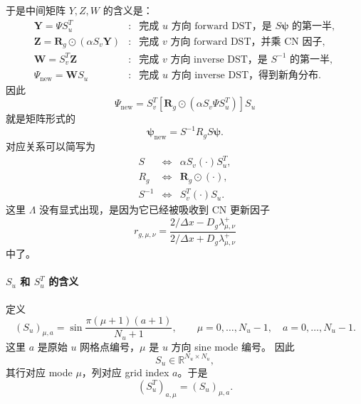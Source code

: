 \documentclass[11pt,a4paper]{ctexart}
\begin{document}
于是中间矩阵 \(Y,Z,W\) 的含义是：
\begin{equation}
\begin{array}{lll}
\mathbf Y=\Psi S_u^T
&:& \text{完成 }u\text{ 方向 forward DST，是 }S\boldsymbol\psi\text{ 的第一半},\\[0.4em]
\mathbf Z=\mathbf R_g\odot(\alpha S_v\mathbf Y)
&:& \text{完成 }v\text{ 方向 forward DST，并乘 CN 因子},\\[0.4em]
\mathbf W=S_v^T\mathbf Z
&:& \text{完成 }v\text{ 方向 inverse DST，是 }S^{-1}\text{ 的第一半},\\[0.4em]
\Psi_{\mathrm{new}}=\mathbf W S_u
&:& \text{完成 }u\text{ 方向 inverse DST，得到新角分布}.
\end{array}
\end{equation}
因此
\begin{equation}
  \boxed{
  \Psi_{\mathrm{new}}
  =
  S_v^T
  \left[
    \mathbf R_g
    \odot
    \left(
      \alpha S_v\Psi S_u^T
    \right)
  \right]
  S_u
  }
\end{equation}
就是矩阵形式的
\begin{equation}
  \boxed{
  \boldsymbol\psi_{\mathrm{new}}
  =
  S^{-1}R_gS\boldsymbol\psi.
  }
\end{equation}
对应关系可以简写为
\begin{equation}
\begin{array}{lll}
S &\Longleftrightarrow& \alpha S_v(\cdot)S_u^T,\\[0.3em]
R_g &\Longleftrightarrow& \mathbf R_g\odot(\cdot),\\[0.3em]
S^{-1} &\Longleftrightarrow& S_v^T(\cdot)S_u.
\end{array}
\end{equation}
这里 \(\Lambda\) 没有显式出现，是因为它已经被吸收到 CN 更新因子
\begin{equation}
  r_{g,\mu,\nu}
  =
  \frac{2/\Delta x-D_g\lambda^+_{\mu,\nu}}
       {2/\Delta x+D_g\lambda^+_{\mu,\nu}}
\end{equation}
中了。

\paragraph{\(S_u\) 和 \(S_u^T\) 的含义}
定义
\begin{equation}
  (S_u)_{\mu,a}
  =
  \sin\frac{\pi(\mu+1)(a+1)}{N_u+1},
  \qquad
  \mu=0,\ldots,N_u-1,\quad a=0,\ldots,N_u-1.
\end{equation}
这里 \(a\) 是原始 \(u\) 网格点编号，\(\mu\) 是 \(u\) 方向 sine mode 编号。
因此
\begin{equation}
  S_u\in\mathbb R^{N_u\times N_u},
\end{equation}
其行对应 mode \(\mu\)，列对应 grid index \(a\)。于是
\begin{equation}
  (S_u^T)_{a,\mu}=(S_u)_{\mu,a}.
\end{equation}
\end{document}
